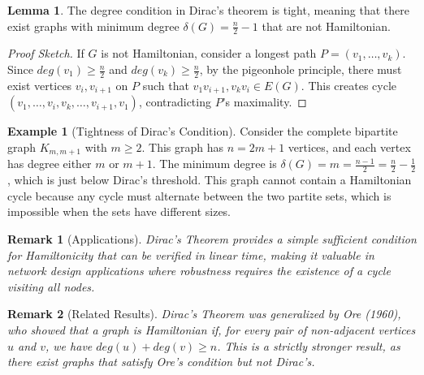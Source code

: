 \documentclass{article}
\newtheorem{remark}{Remark}
\theoremstyle{definition}
\newtheorem{example}{Example}
\def\deg{deg}%
\newtheorem{lemma}{Lemma}
\begin{document}
\begin{lemma}
The degree condition in Dirac's theorem is tight, meaning that there exist graphs with minimum degree $\delta(G) = \frac{n}{2} - 1$ that are not Hamiltonian.
\end{lemma}
\begin{proof}[Proof Sketch]
If $G$ is not Hamiltonian, consider a longest path $P = (v_1, \ldots, v_k)$. Since $\deg(v_1) \geq \frac{n}{2}$ and $\deg(v_k) \geq \frac{n}{2}$, by the pigeonhole principle, there must exist vertices $v_i, v_{i+1}$ on $P$ such that $v_1v_{i+1}, v_kv_i \in E(G)$. This creates cycle $(v_1, \ldots, v_i, v_k, \ldots, v_{i+1}, v_1)$, contradicting $P$'s maximality.
\end{proof}
\begin{example}[Tightness of Dirac's Condition]
Consider the complete bipartite graph $K_{m,m+1}$ with $m \geq 2$. This graph has $n = 2m+1$ vertices, and each vertex has degree either $m$ or $m+1$. The minimum degree is $\delta(G) = m = \frac{n-1}{2} = \frac{n}{2} - \frac{1}{2}$, which is just below Dirac's threshold. This graph cannot contain a Hamiltonian cycle because any cycle must alternate between the two partite sets, which is impossible when the sets have different sizes.
\end{example}
\begin{remark}[Applications]
Dirac's Theorem provides a simple sufficient condition for Hamiltonicity that can be verified in linear time, making it valuable in network design applications where robustness requires the existence of a cycle visiting all nodes.
\end{remark}
\begin{remark}[Related Results]
Dirac's Theorem was generalized by Ore (1960), who showed that a graph is Hamiltonian if, for every pair of non-adjacent vertices $u$ and $v$, we have $\deg(u) + \deg(v) \geq n$. This is a strictly stronger result, as there exist graphs that satisfy Ore's condition but not Dirac's.
\end{remark}
\end{document}

